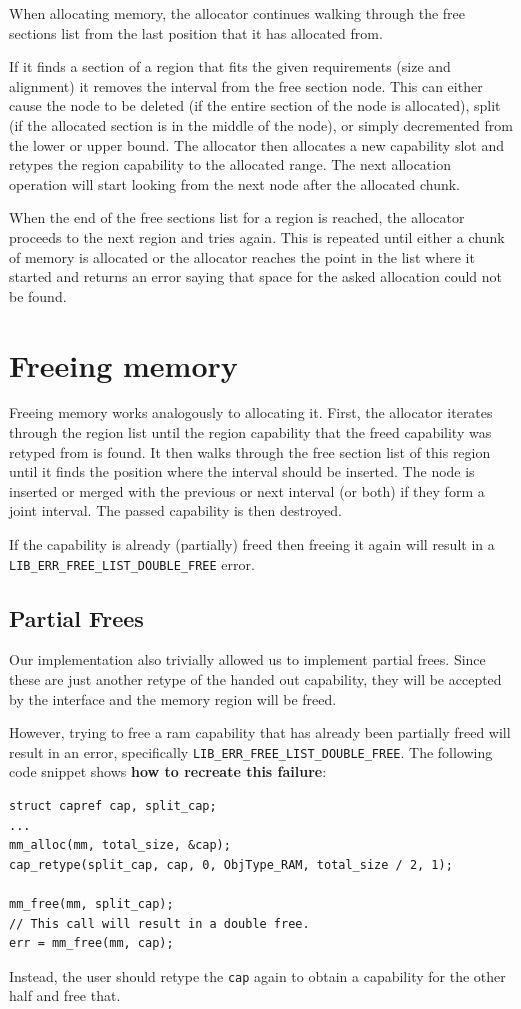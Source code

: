 When allocating memory, the allocator continues walking through the free sections list from the last position that it has allocated from.

If it finds a section of a region that fits the given requirements (size and alignment) it removes the interval from the free section node.
This can either cause the node to be deleted (if the entire section of the node is allocated), split (if the allocated section is in the middle of the node), or simply decremented from the lower or upper bound.
The allocator then allocates a new capability slot and retypes the region capability to the allocated range.
The next allocation operation will start looking from the next node after the allocated chunk.

When the end of the free sections list for a region is reached, the allocator proceeds to the next region and tries again.
This is repeated until either a chunk of memory is allocated or the allocator reaches the point in the list where it started and returns an error saying that space for the asked allocation could not be found.

\section{Freeing memory}
Freeing memory works analogously to allocating it.
First, the allocator iterates through the region list until the region capability that the freed capability was retyped from is found.
It then walks through the free section list of this region until it finds the position where the interval should be inserted.
The node is inserted or merged with the previous or next interval (or both) if they form a joint interval.
The passed capability is then destroyed.

If the capability is already (partially) freed then freeing it again will result in a \texttt{LIB_ERR_FREE_LIST_DOUBLE_FREE} error.

\subsection{Partial Frees}
Our implementation also trivially allowed us to implement partial frees.
Since these are just another retype of the handed out capability, they will be accepted by the interface and the memory region will be freed.

However, trying to free a ram capability that has already been partially freed will result in an error, specifically \texttt{LIB_ERR_FREE_LIST_DOUBLE_FREE}.
The following code snippet shows \textbf{how to recreate this failure}:
\begin{verbatim}
struct capref cap, split_cap;
...
mm_alloc(mm, total_size, &cap);
cap_retype(split_cap, cap, 0, ObjType_RAM, total_size / 2, 1);

mm_free(mm, split_cap);
// This call will result in a double free.
err = mm_free(mm, cap);
\end{verbatim}
Instead, the user should retype the \texttt{cap} again to obtain a capability for the other half and free that.


